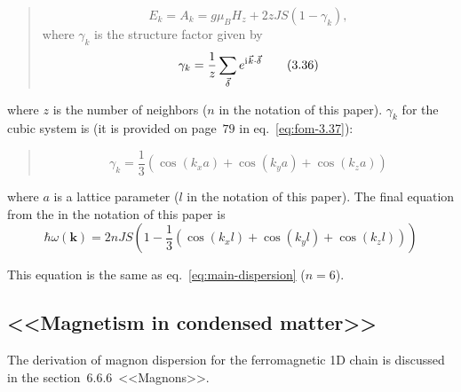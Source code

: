     \begin{quote}
        \begin{equation}
            E_k = A_k = g\mu_B H_z + 2zJS(1 - \gamma_k), \label{eq:fom-3.35} \tag{3.35}
        \end{equation}
        where $\gamma_k$ is the structure factor given by
        \begin{equation}
            \gamma_k = \dfrac{1}{z}\sum_{\vec{\delta}}e^{\mathrm{i}\mkern1mu \vec{k}\cdot\vec{\delta}} \label{eq:fom-3.36} \tag{3.36}
        \end{equation}
    \end{quote}
    where $z$ is the number of neighbors ($n$ in the notation of this paper). $\gamma_k$ for the cubic system is (it is provided on page~$79$ in eq.~\eqref{eq:fom-3.37}):
    \begin{quote}
        \begin{equation}
            \gamma_k = \dfrac{1}{3}(\cos(k_xa) + \cos(k_ya) + \cos(k_za)) \label{eq:fom-3.37} \tag{3.37}
        \end{equation}
    \end{quote}
    where $a$ is a lattice parameter ($l$ in the notation of this paper). The final equation from the \cite{rezende2020fundamentals} in the notation of this paper is
    \begin{equation}
        \hbar\omega(\mathbf{k}) = 2nJS\left(1 - \dfrac{1}{3}\left(\cos(k_xl) + \cos(k_yl) + \cos(k_zl)\right)\right)
        \label{eq:rezende}
    \end{equation}

    This equation is the same as eq.~\eqref{eq:main-dispersion} ($n = 6$).

\subsection{<<Magnetism in condensed matter>>\cite{blundell2003magnetism}}
    The derivation of magnon dispersion for the ferromagnetic 1D chain is discussed in the section~$6.6.6$~<<Magnons>>.

